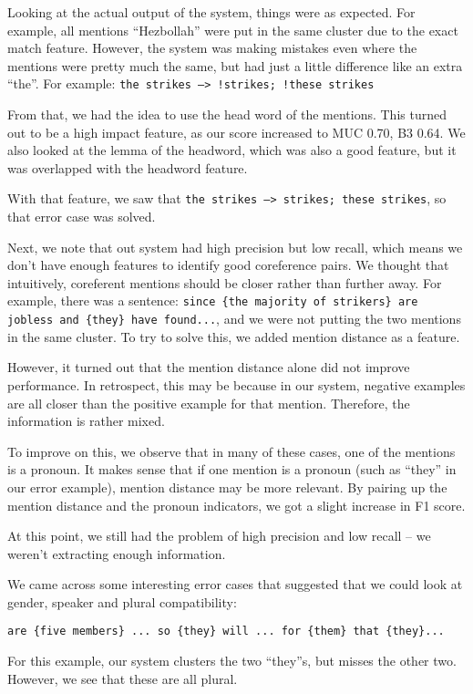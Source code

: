 \documentclass[12pt, twocolumn]{article}
\begin{document}
Looking at the actual output of the system, things were as expected. For example, all mentions ``Hezbollah'' were put in the same cluster due to the exact match feature. However, the system was making mistakes even where the mentions were pretty much the same, but had just a little difference like an extra ``the''. For example: \texttt{{the strikes} -->  !{strikes}; !{these strikes}}

From that, we had the idea to use the head word of the mentions. This turned out to be a high impact feature, as our score increased to MUC 0.70, B3 0.64. We also looked at the lemma of the headword, which was also a good feature, but it was overlapped with the headword feature.

With that feature, we saw that \texttt{{the strikes} -->  {strikes}; {these strikes}}, so that error case was solved. 

Next, we note that out system had high precision but low recall, which means we don't have enough features to identify good coreference pairs. We thought that intuitively, coreferent mentions should be closer rather than further away. For example, there was a sentence: \texttt{since \{{the majority of strikers\}} are jobless and {\{they\}} have found...}, and we were not putting the two mentions in the same cluster. To try to solve this, we added mention distance as a feature.

However, it turned out that the mention distance alone did not improve performance. In retrospect, this may be because in our system, negative examples are all closer than the positive example for that mention. Therefore, the information is rather mixed.

To improve on this, we observe that in many of these cases, one of the mentions is a pronoun. It makes sense that if one mention is a pronoun (such as ``they'' in our error example), mention distance may be more relevant. By pairing up the mention distance and the pronoun indicators, we got a slight increase in F1 score.

At this point, we still had the problem of high precision and low recall -- we weren't extracting enough information.

We came across some interesting error cases that suggested that we could look at gender, speaker and plural compatibility:

\texttt{are \{{five members\}} ... so \{{they\}} will ... for \{{them\}} that \{{they\}}...}

For this example, our system clusters the two ``they''s, but misses the other two. However, we see that these are all plural.
\end{document}
